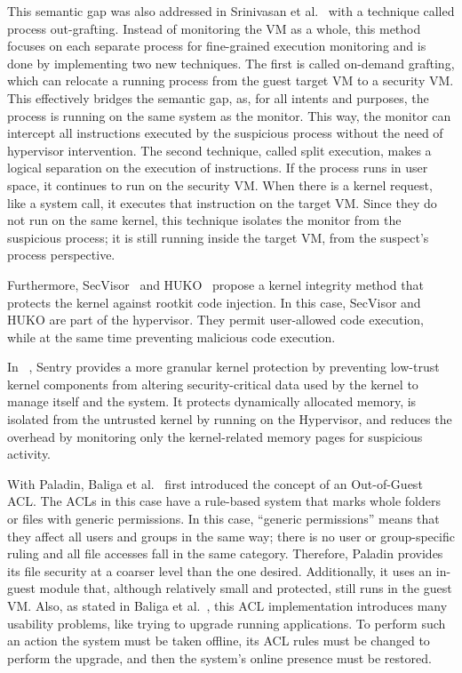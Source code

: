 \par This semantic gap was also addressed in Srinivasan et al.~\cite{srinivasan2011process} with a technique called process out-grafting. Instead of monitoring the \ac{VM} as a whole, this method focuses on each separate process for fine-grained execution monitoring and is done by implementing two new techniques. The first is called on-demand grafting, which can relocate a running process from the guest target \ac{VM} to a security \ac{VM}. This effectively bridges the semantic gap, as, for all intents and purposes, the process is running on the same system as the monitor. This way, the monitor can intercept all instructions executed by the suspicious process without the need of hypervisor intervention. The second technique, called split execution, makes a logical separation on the execution of instructions. If the process runs in user space, it continues to run on the security \ac{VM}. When there is a kernel request, like a system call, it executes that instruction on the target \ac{VM}. Since they do not run on the same kernel, this technique isolates the monitor from the suspicious process; it is still running inside the target \ac{VM}, from the suspect’s process perspective. 

\par Furthermore, SecVisor~\cite{seshadri2007secvisor} and HUKO~\cite{xiong2011practical} propose a kernel integrity method that protects the kernel against rootkit code injection. In this case, SecVisor and HUKO are part of the hypervisor. They permit user-allowed code execution, while at the same time preventing malicious code execution.


\par In ~\cite{srivastava2012efficient}, Sentry provides a more granular kernel protection by preventing low-trust kernel components from altering security-critical data used by the kernel to manage itself and the system. It protects dynamically allocated memory, is isolated from the untrusted kernel by running on the Hypervisor, and reduces the overhead by monitoring only the kernel-related memory pages for suspicious activity.


\par With Paladin, Baliga et al.~\cite{baliga2008automated} first introduced the concept of an Out-of-Guest \ac{ACL}. The \acp{ACL} in this case have a rule-based system that marks whole folders or files with generic permissions. In this case, ``generic permissions'' means that they affect all users and groups in the same way; there is no user or group-specific ruling and all file accesses fall in the same category. Therefore, Paladin provides its file security at a coarser level than the one desired. Additionally, it uses an in-guest module that, although relatively small and protected, still runs in the guest \ac{VM}. Also, as stated in Baliga et al.~\cite{baliga2008automated}, this \ac{ACL} implementation introduces many usability problems, like trying to upgrade running applications. To perform such an action the system must be taken offline, its \ac{ACL} rules must be changed to perform the upgrade, and then the system's online presence must be restored. 

